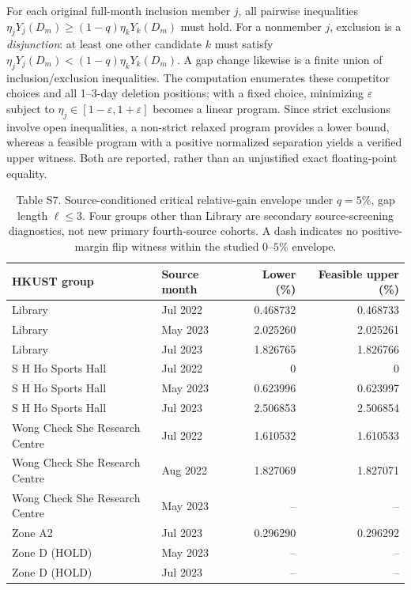\documentclass[11pt]{article}
\begin{document}
For each original full-month inclusion member $j$, all pairwise inequalities $\eta_jY_j(D_m)\ge(1-q)\eta_kY_k(D_m)$ must hold. For a nonmember $j$, exclusion is a \emph{disjunction}: at least one other candidate $k$ must satisfy $\eta_jY_j(D_m)<(1-q)\eta_kY_k(D_m)$. A gap change likewise is a finite union of inclusion/exclusion inequalities. The computation enumerates these competitor choices and all 1--3-day deletion positions; with a fixed choice, minimizing $\varepsilon$ subject to $\eta_j\in[1-\varepsilon,1+\varepsilon]$ becomes a linear program. Since strict exclusions involve open inequalities, a non-strict relaxed program provides a lower bound, whereas a feasible program with a positive normalized separation yields a verified upper witness. Both are reported, rather than an unjustified exact floating-point equality.

\begin{table}[htbp]
\centering
\caption*{Table S7. Source-conditioned critical relative-gain envelope under $q=5\%$, gap length $\ell\leq3$. Four groups other than Library are secondary source-screening diagnostics, not new primary fourth-source cohorts. A dash indicates no positive-margin flip witness within the studied $0$--$5\%$ envelope.}
\small
\begin{tabular}{p{4.4cm}lrr}
\toprule
HKUST group & Source month & Lower (\%) & Feasible upper (\%) \\
\midrule
Library & Jul 2022 & 0.468732 & 0.468733\\
Library & May 2023 & 2.025260 & 2.025261\\
Library & Jul 2023 & 1.826765 & 1.826766\\
S H Ho Sports Hall & Jul 2022 & 0 & 0\\
S H Ho Sports Hall & May 2023 & 0.623996 & 0.623997\\
S H Ho Sports Hall & Jul 2023 & 2.506853 & 2.506854\\
Wong Check She Research Centre & Jul 2022 & 1.610532 & 1.610533\\
Wong Check She Research Centre & Aug 2022 & 1.827069 & 1.827071\\
Wong Check She Research Centre & May 2023 & -- & --\\
Zone A2 & Jul 2023 & 0.296290 & 0.296292\\
Zone D (HOLD) & May 2023 & -- & --\\
Zone D (HOLD) & Jul 2023 & -- & --\\
\bottomrule
\end{tabular}
\end{table}
\end{document}
